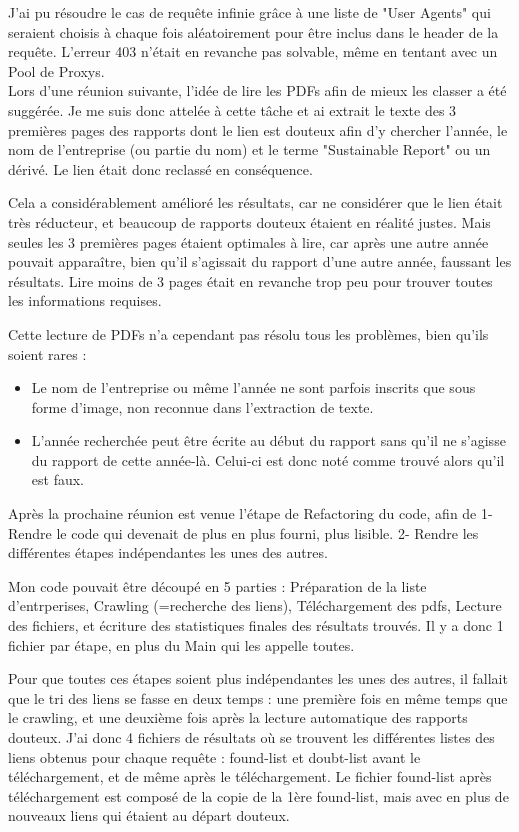 J'ai pu résoudre le cas de requête infinie grâce à une liste de "User Agents" qui seraient choisis à chaque fois aléatoirement pour être inclus dans le header de la requête.
L'erreur 403 n'était en revanche pas solvable, même en tentant avec un Pool de Proxys. 
\\

Lors d'une réunion suivante, l'idée de lire les PDFs afin de mieux les classer a été suggérée. 
Je me suis donc attelée à cette tâche et ai extrait le texte des 3 premières pages des rapports dont le lien est douteux afin d'y chercher l'année, le nom de l'entreprise (ou partie du nom) et le terme "Sustainable Report" ou un dérivé.
Le lien était donc reclassé en conséquence.

Cela a considérablement amélioré les résultats, car ne considérer que le lien était très réducteur, et beaucoup de rapports douteux étaient en réalité justes.
Mais seules les 3 premières pages étaient optimales à lire, car après une autre année pouvait apparaître, bien qu'il s'agissait du rapport d'une autre année, faussant les résultats.
Lire moins de 3 pages était en revanche trop peu pour trouver toutes les informations requises.

Cette lecture de PDFs n'a cependant pas résolu tous les problèmes, bien qu'ils soient rares :
\begin{itemize}
    \item Le nom de l'entreprise ou même l'année ne sont parfois inscrits que sous forme d'image, non reconnue dans l'extraction de texte.
    \item L'année recherchée peut être écrite au début du rapport sans qu'il ne s'agisse du rapport de cette année-là. Celui-ci est donc noté comme trouvé alors qu'il est faux.
\end{itemize}

Après la prochaine réunion est venue l'étape de Refactoring du code, afin de 1-Rendre le code qui devenait de plus en plus fourni, plus lisible. 
2- Rendre les différentes étapes indépendantes les unes des autres.

Mon code pouvait être découpé en 5 parties : Préparation de la liste d'entrperises, Crawling (=recherche des liens), Téléchargement des pdfs, Lecture des fichiers, et écriture des statistiques finales des résultats trouvés.
Il y a donc 1 fichier par étape, en plus du Main qui les appelle toutes. 

Pour que toutes ces étapes soient plus indépendantes les unes des autres, il fallait que le tri des liens se fasse en deux temps : une première fois en même temps que le crawling, et une deuxième fois après la lecture automatique des rapports douteux.
J'ai donc 4 fichiers de résultats où se trouvent les différentes listes des liens obtenus pour chaque requête : found-list et doubt-list avant le téléchargement, et de même après le téléchargement.
Le fichier found-list après téléchargement est composé de la copie de la 1ère found-list, mais avec en plus de nouveaux liens qui étaient au départ douteux.
\\

